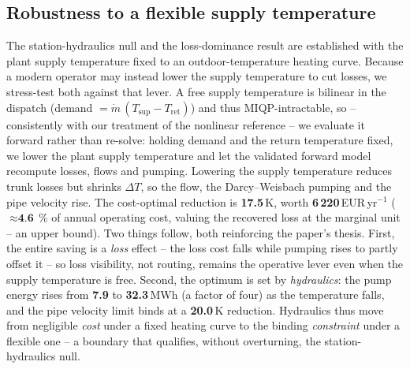 \documentclass[a4paper,fleqn]{cas-dc}
\begin{document}
\subsection{Robustness to a flexible supply temperature}
\label{subsec:tsup}
The station-hydraulics null and the loss-dominance result are established with the plant
supply temperature fixed to an outdoor-temperature heating curve. Because a modern operator
may instead lower the supply temperature to cut losses, we stress-test both against that
lever. A free supply temperature is bilinear in the dispatch (demand $=\dot m\,(T_\text{sup}
-T_\text{ret})$) and thus MIQP-intractable, so -- consistently with our treatment of the
nonlinear reference -- we evaluate it forward rather than re-solve: holding demand and the
return temperature fixed, we lower the plant supply temperature and let the validated forward
model recompute losses, flows and pumping. Lowering the supply temperature reduces trunk
losses but shrinks $\Delta T$, so the flow, the Darcy--Weisbach pumping and the pipe velocity
rise. The cost-optimal reduction is \textbf{17.5}\,K, worth
\textbf{6\,220}\,EUR\,yr$^{-1}$ ($\approx\textbf{4.6}$\,\% of annual
operating cost, valuing the recovered loss at the marginal unit -- an upper bound). Two things
follow, both reinforcing the paper's thesis. First, the entire saving is a \emph{loss} effect
-- the loss cost falls while pumping rises to partly offset it -- so loss visibility, not
routing, remains the operative lever even when the supply temperature is free. Second, the
optimum is set by \emph{hydraulics}: the pump energy rises from \textbf{7.9} to
\textbf{32.3}\,MWh (a factor of four) as the temperature falls, and the pipe
velocity limit binds at a \textbf{20.0}\,K reduction. Hydraulics thus move
from negligible \emph{cost} under a fixed heating curve to the binding \emph{constraint} under
a flexible one -- a boundary that qualifies, without overturning, the station-hydraulics null.

\end{document}

